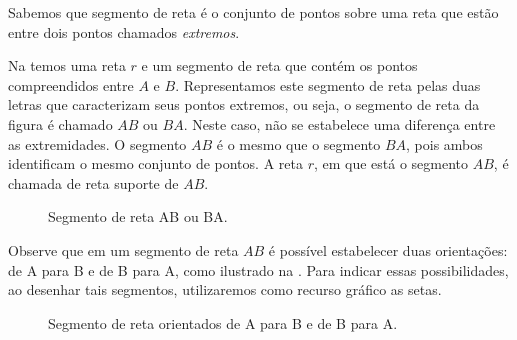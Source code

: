Sabemos que segmento de reta é o conjunto de pontos sobre uma reta que estão entre dois pontos chamados \textit{extremos}.

Na  temos uma reta \(r\) e um segmento de reta que contém os pontos compreendidos entre \(A\) e \(B\). Representamos este segmento de reta pelas duas letras que caracterizam seus pontos extremos, ou seja, o segmento de reta da figura é chamado \(AB\) ou \(BA\). Neste caso, não se estabelece uma diferença entre as extremidades. O segmento \(AB\) é o mesmo que o segmento \(BA\), pois ambos identificam o mesmo conjunto de pontos. A reta \(r\), em que está o segmento \(AB\), é chamada de reta suporte de \(AB\).

\begin{figure}[H]\centering{}\caption{Segmento de reta AB ou BA.\label{fig-geometria-operacoesvetores-01}}
\end{figure}

Observe que em um segmento de reta \(AB\) é possível estabelecer duas orientações: de A para B e de B para A, como ilustrado na . Para indicar essas possibilidades, ao desenhar tais segmentos, utilizaremos como recurso gráfico as setas.

\begin{figure}[H]\centering{}\caption{Segmento de reta orientados de A para B e de B para A. \label{fig-geometria-operacoesvetores-02}}\end{figure}

